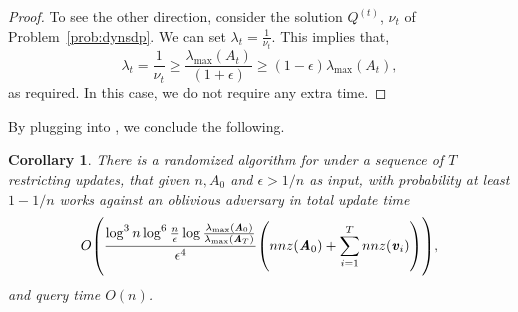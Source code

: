 \documentclass[11pt]{article}
\newtheorem{corollary}[theorem]{Corollary}
\let\originalleft\left
\let\originalright\right
\renewcommand{\left}{\mathopen{}\mathclose\bgroup\originalleft}
\renewcommand{\right}{\aftergroup\egroup\originalright}
\newcommand\vv{\boldsymbol{\mathit{v}}}
\renewcommand\AA{\boldsymbol{\mathit{A}}}
\newcommand\QQ{\boldsymbol{\mathit{Q}}}
\begin{document}
\begin{proof}
To see the other direction, consider the solution $\QQ^{(t)}$, $\nu_t$ of Problem~\ref{prob:dynsdp}. We can set $\lambda_t = \frac{1}{\nu_t}$. This implies that,
\[
\lambda_t = \frac{1}{\nu_t}\geq \frac{\lambda_{\max}(\AA_t)}{(1+\epsilon)} \geq (1-\epsilon)\lambda_{\max}(\AA_t),
\]
as required. In this case, we do not require any extra time.
\end{proof}

By plugging  into , we conclude the following.
\begin{corollary} There is a randomized algorithm for  under a sequence of $T$ restricting updates, that given $n, \AA_0$ and $\epsilon>1/n$ as input, with probability at least $1-1/n$ works against an oblivious adversary in total update time
\[
 O\left(\frac{\log^{3}n \log^6 \frac{n}{\epsilon}\log \frac{\lambda_{\max}(\AA_0)}{\lambda_{\max}(\AA_T)}}{\epsilon^{4}}\left(nnz(\AA_0) + \sum_{i=1}^T nnz(\vv_i)\right) \right),
 \]
and query time $O(n)$.
\end{corollary}         
\end{document}
